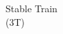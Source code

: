 \documentclass[preview]{standalone}
\begin{document}
\begin{center}
Stable Train\\(3T)
\end{center}
\end{document}
